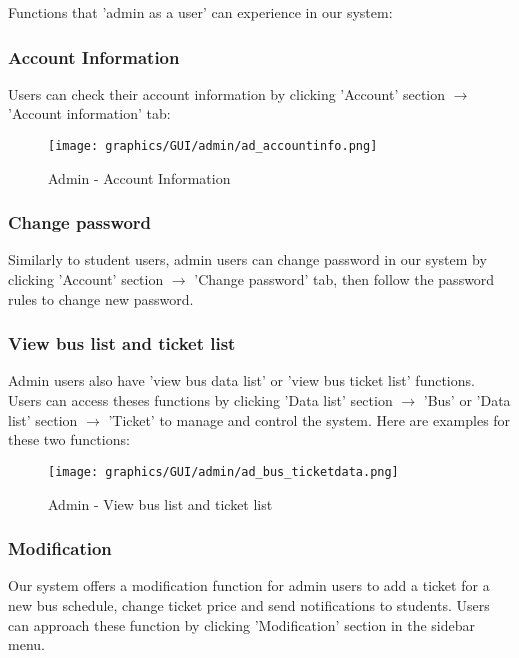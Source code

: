     
    \noindent Functions that 'admin as a user' can experience in our system:
        \subsubsection{Account Information}
                \noindent Users can check their account information by clicking 'Account' section $\rightarrow$ 'Account information' tab:
                    \begin{figure}[H]
                        \centering
                        \texttt{[image: graphics/GUI/admin/ad\_accountinfo.png]}
                        \caption{Admin - Account Information}
                    \label{fig:ad_accountinfo}
                    \end{figure}
                
        \subsubsection{Change password}
        \noindent Similarly to student users, admin users can change password in our system by clicking 'Account' section $\rightarrow$ 'Change password' tab, then follow the password rules to change new password.
            
        \subsubsection{View bus list and ticket list}  
        \noindent Admin users also have 'view bus data list' or 'view bus ticket list' functions. Users can access theses functions by clicking 'Data list' section $\rightarrow$ 'Bus' or 'Data list' section $\rightarrow$ 'Ticket' to manage and control the system. Here are examples for these two functions:
                \begin{figure}[H]
                    \centering
                    \texttt{[image: graphics/GUI/admin/ad\_bus\_ticketdata.png]}
                    \caption{Admin - View bus list and ticket list}
                \label{fig:ad_busticketlist}
                \end{figure}
                
        \subsubsection{Modification}
        \noindent Our system offers a modification function for admin users to add a ticket for a new bus schedule, change ticket price and send notifications to students. Users can approach these function by clicking 'Modification' section in the sidebar menu.
            
